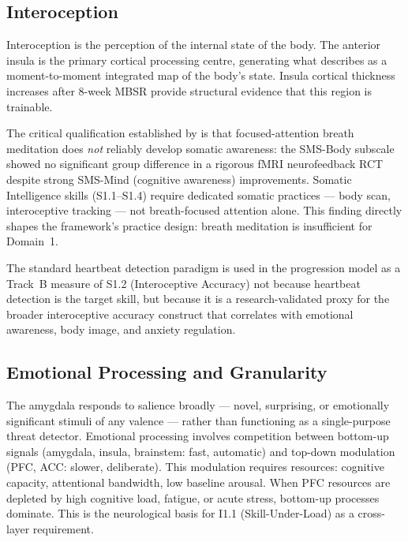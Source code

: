 \documentclass[12pt, a4paper]{article}
\begin{document}
\subsection{Interoception}

Interoception is the perception of the internal state of the body. The anterior
insula is the primary cortical processing centre, generating what \citeauthor{calderone2024}
describes as a moment-to-moment integrated map of the body's state. Insula cortical
thickness increases after 8-week MBSR \citep{calderone2024} provide structural
evidence that this region is trainable.

The critical qualification established by \citet{ganesan2025} is that
focused-attention breath meditation does \emph{not} reliably develop somatic
awareness: the SMS-Body subscale showed no significant group difference in a rigorous
fMRI neurofeedback RCT despite strong SMS-Mind (cognitive awareness) improvements.
Somatic Intelligence skills (S1.1--S1.4) require dedicated somatic practices ---
body scan, interoceptive tracking --- not breath-focused attention alone. This
finding directly shapes the framework's practice design: breath meditation is
insufficient for Domain~1.

The standard heartbeat detection paradigm \citep{schandry1981} is used in the
progression model as a Track~B measure of S1.2 (Interoceptive Accuracy) not because
heartbeat detection is the target skill, but because it is a research-validated
proxy for the broader interoceptive accuracy construct that correlates with emotional
awareness, body image, and anxiety regulation.

\subsection{Emotional Processing and Granularity}

The amygdala responds to salience broadly --- novel, surprising, or emotionally
significant stimuli of any valence --- rather than functioning as a single-purpose
threat detector. Emotional processing involves competition between bottom-up signals
(amygdala, insula, brainstem: fast, automatic) and top-down modulation (PFC, ACC:
slower, deliberate). This modulation requires resources: cognitive capacity,
attentional bandwidth, low baseline arousal. When PFC resources are depleted by high
cognitive load, fatigue, or acute stress, bottom-up processes dominate. This is the
neurological basis for I1.1 (Skill-Under-Load) as a cross-layer requirement.
\end{document}
